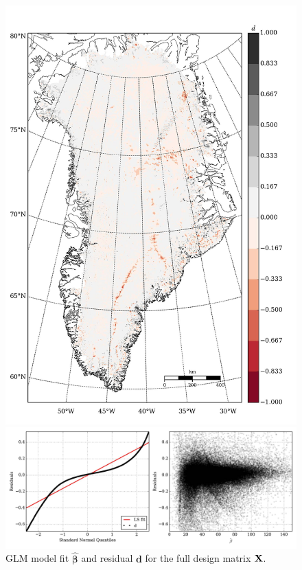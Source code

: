 \begin{figure}
\begin{minipage}[b]{0.47\linewidth}
    \includegraphics[width=1.0\textwidth]{images/greenland/stats/GLM_resid_no_uvw.jpg}
  \end{minipage}
  \begin{minipage}[b]{0.99\linewidth}
    \includegraphics[width=1.0\textwidth]{images/greenland/stats/GLM_resid-NQ_no_uvw.jpg}
  \end{minipage}
  \caption[]{GLM model fit $\bm{\hat{\beta}}$ and residual $\mathbf{d}$ for the full design matrix $\mathbf{X}$.}
\end{figure}


